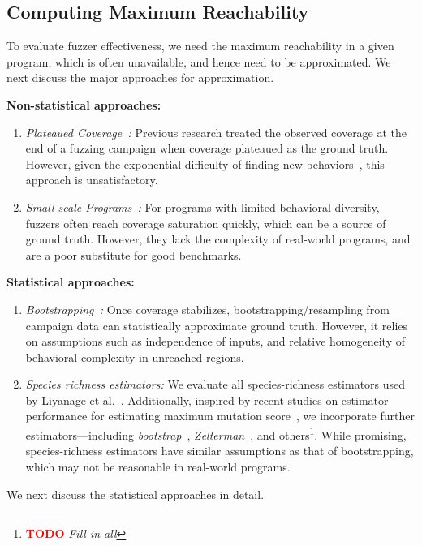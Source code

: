 \documentclass[conference,anonymous,review]{IEEEtran}
\newcounter{todocounter}
\newcommand{\todo}[1]{\marginpar{$|$}\textcolor{red}{\stepcounter{todocounter}\footnote[\thetodocounter]{\textcolor{red}{\textbf{TODO }}\textit{#1}}}}
\begin{document}
\subsection{Computing Maximum Reachability}
\label{sec:reachability}
To evaluate fuzzer effectiveness, we need the maximum reachability in a given program, which is often unavailable, and hence need to be approximated. We next discuss the major approaches for approximation.

\noindent\textbf{Non-statistical approaches:} 
\begin{enumerate}
    \item \emph{Plateaued Coverage~\cite{boehme2018stads}:} Previous research treated the observed coverage at the end of a fuzzing campaign when coverage plateaued as the ground truth. However, given the exponential difficulty of finding new behaviors~\cite{boehme2021residual}, this approach is unsatisfactory.
    \item \emph{Small-scale Programs~\cite{liyanage2023reachable}:} For programs with limited behavioral diversity, fuzzers often reach coverage saturation quickly, which can be a source of ground truth. However, they lack the complexity of real-world programs, and are a poor substitute for good benchmarks.
\end{enumerate}
    
\noindent\textbf{Statistical approaches:} 
\begin{enumerate}
    \item \emph{Bootstrapping~\cite{liyanage2023reachable}:} 
    Once coverage stabilizes, bootstrapping/resampling from campaign data can statistically approximate ground truth. However, it relies on assumptions such as independence of inputs, and relative homogeneity of behavioral complexity in unreached regions. 
    \item\emph{Species richness estimators:} We evaluate all species-richness estimators used by Liyanage et al.~\cite{liyanage2023reachable}. Additionally, inspired by recent studies on estimator performance for estimating maximum mutation score~\cite{Kuznetsov2024empirical}, we incorporate further estimators---including \emph{bootstrap}~\cite{smith1984nonparametric}, \emph{Zelterman}~\cite{bohning2010some}, and others\todo{Fill in all}. While promising, species-richness estimators have similar assumptions as that of bootstrapping, which may not be reasonable in real-world programs.
\end{enumerate}
% 
We next discuss the statistical approaches in detail.
\end{document}
